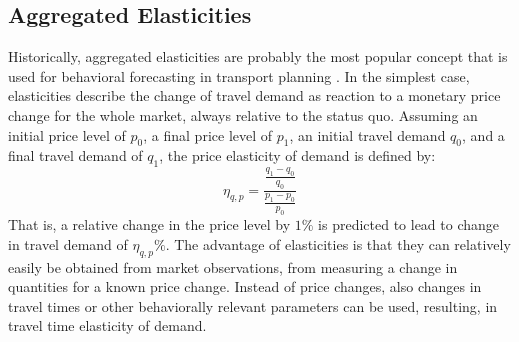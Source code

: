 \begin{oframed}
%
%
\subsection{Aggregated Elasticities}
\label{ch:economicEval:describingBehavior:elasticities}
%
%
Historically, aggregated elasticities are probably the most popular concept that is used for behavioral forecasting in transport planning \citep[see, e.g.,][]{deJong2001Elasticities, 
GrahamGlaister2002FuelPriceElasticities, ParrySmall2005OptimalGasolineTax}.
%
In the simplest case, elasticities describe the change of travel demand as reaction to a monetary price change for the whole market, always relative to the status quo. Assuming an initial price level of $p_0$, a final price level of $p_1$, an initial travel demand $q_0$, and a final travel demand of $q_1$, the price elasticity of demand is defined by:
%
\begin{equation}
\eta_{q,p} = \frac{\frac{q_{1} - q_{0}}{q_{0}}}{\frac{p_{1} - p_{0}}{p_{0}}}
\end{equation}
%
That is, a relative change in the price level by $1\%$ is predicted to lead to change in travel demand of $\eta_{q,p} \%$.
%
The advantage of elasticities is that they can relatively easily be obtained from market observations, \ie from measuring a change in quantities for a known price change. Instead of price changes, also changes in travel times or other behaviorally relevant parameters can be used, resulting, \eg in travel time elasticity of demand.


\end{oframed}
